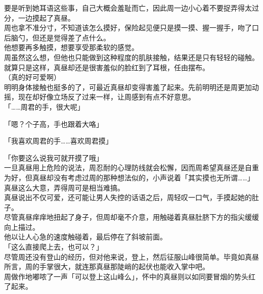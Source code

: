 要是听到她耳语这些事，自己大概会羞耻而亡，因此周一边小心着不要捉弄得太过分，一边摸起了真昼。\\

周也拿不准分寸，不知道该怎么摸好，保险起见便只是摸一摸、握一握手，吻了口后脑勺，但还是觉得差了点什么。\\

他想要再多触摸，想要享受那柔软的感觉。\\

周虽然这么想，但他也只能做到这种程度的肌肤接触，结果还是只有轻轻的碰触。\\

就算只是这样，真昼却还是很害羞似的脸红到了耳根，任由摆布。\\

（真的好可爱啊）\\

明明身体接触也挺多的了，可最近真昼却变得害羞了起来。先前明明还是周更加动摇，现在却好像立场反了过来一样，让周感到有点不好意思。\\

「……周君的手，很大呢」

「嗯？个子高，手也跟着大咯」

「我喜欢周君的手……喜欢周君摸」

「你要这么说我可就开摸了哦」\\

一旦真昼用上危险的说法，周忍耐的心理防线就会松懈，因而周希望真昼还是自重为好，但真昼却没有考虑过周的那种想法似的，小声说着「其实摸也无所谓……」\\

真昼这么大意，弄得周可是相当难搞。\\

真昼说出不仅可爱，还可能让男人失控的话语之后，周轻叹一口气，手摸起她的肚子。\\

尽管真昼痒痒地扭起了身子，但周却毫不介意，用触碰着真昼肚脐下方的指尖缓缓向上描过。\\

他以让人心急的速度触碰着，最后停在了斜坡前面。\\

「这么直接爬上去，也可以？」\\

尽管周还没有登山的经历，但对他来说，登上，然后征服山峰很简单。毕竟如真昼所言，周的手掌很大，就连那真昼那陡峭的起伏也能收入掌中吧。\\

周做作地嘟哝了一声「可以登上这山峰么」，怀中的真昼则以如同要冒烟的势头红了起来。

